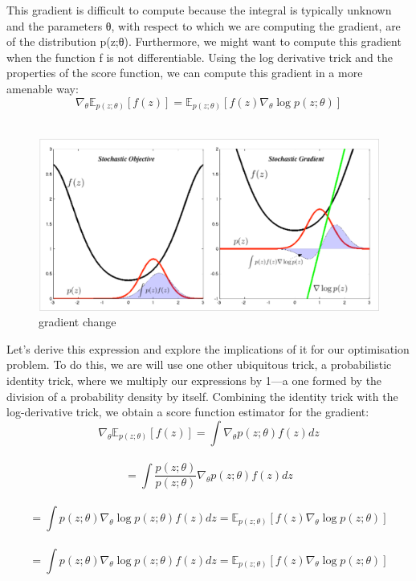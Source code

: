 \documentclass[12pt,a4paper]{article}
\begin{document}
This gradient is difficult to compute because the integral is typically unknown and the parameters θ, with respect to which we are computing the gradient, are of the distribution p(z;θ). Furthermore, we might want to compute this gradient when the function f is not differentiable. Using the log derivative trick and the properties of the score function, we can compute this gradient in a more amenable way:\\
$$\nabla_\theta \mathbb{E}_{p(z;\theta)}[f(z)] = \mathbb{E}_{p(z;\theta)}[f(z)\nabla_\theta \log p(z;\theta)]$$\\
\begin{figure}[hbt!]
\begin{center}
\includegraphics[scale=0.6]{gradient change}
\caption{gradient change}%
\end{center}
\end{figure}
Let's derive this expression and explore the implications of it for our optimisation problem. To do this, we are will use one other ubiquitous trick, a probabilistic identity trick, where we multiply our expressions by 1—a one formed by the division of a probability density by itself.  Combining the identity trick with the log-derivative trick, we obtain a score function estimator for the gradient:\\
$$\nabla_\theta \mathbb{E}_{p(z;\theta)}[f(z)]=\int\nabla_\theta p(z;\theta)f(z) dz$$\\[6pt]
$$= \int \frac{p(z;\theta)}{p(z;\theta)}\nabla_\theta p(z;\theta)f(z) dz$$\\[6pt]
$$=\int p(z;\theta)\nabla_\theta \log p(z;\theta)f(z) dz = \mathbb{E}_{p(z;\theta)}[f(z)\nabla_\theta \log p(z;\theta)]$$\\[6pt]
$$=\int p(z;\theta)\nabla_\theta \log p(z;\theta)f(z) dz = \mathbb{E}_{p(z;\theta)}[f(z)\nabla_\theta \log p(z;\theta)]$$\\[6pt]
\end{document}
